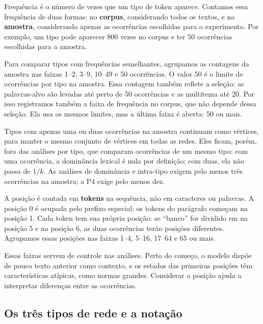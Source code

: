 Frequência é o número de vezes que um tipo de token aparece. Contamos essa frequência de duas
formas: no \textbf{corpus}, considerando todos os textos, e na \textbf{amostra}, considerando
apenas as ocorrências escolhidas para o experimento. Por exemplo, um tipo pode aparecer 800
vezes no corpus e ter 50 ocorrências escolhidas para a amostra.

Para comparar tipos com frequências semelhantes, agrupamos as contagens da amostra nas faixas
1--2, 3--9, 10--49 e 50 ocorrências. O valor 50 é o limite de ocorrências por tipo na amostra.
Essa contagem também reflete a seleção: as palavras-alvo são levadas até perto de 50 ocorrências
e as multitema até 20. Por isso registramos também a faixa de frequência no corpus, que não
depende dessa seleção. Ela usa os mesmos limites, mas a última faixa é aberta: 50 ou mais.

Tipos com apenas uma ou duas ocorrências na amostra continuam como vértices, para manter o
mesmo conjunto de vértices em todas as redes. Eles ficam, porém, fora das análises por tipo,
que comparam ocorrências de um mesmo tipo: com uma ocorrência, a dominância lexical é nula por
definição; com duas, ela não passa de $1/k$. As análises de dominância e intra-tipo exigem pelo
menos três ocorrências na amostra; a P4 exige pelo menos dez.

A posição é contada em \textbf{tokens} na sequência, não em caracteres ou palavras. A posição
0 é ocupada pelo prefixo especial; os tokens do parágrafo começam na posição 1. Cada token tem
sua própria posição: se ``banco'' for dividido em  na posição 5 e  na posição
6, as duas ocorrências terão posições diferentes. Agrupamos essas posições nas faixas 1--4,
5--16, 17--64 e 65 ou mais.

Essas faixas servem de controle nas análises. Perto do começo, o modelo dispõe de pouco texto
anterior como contexto, e os estados das primeiras posições têm características atípicas, como
normas grandes. Considerar a posição ajuda a interpretar diferenças entre as ocorrências.

\subsection{Os três tipos de rede e a notação}\label{sec:tipos-rede}

